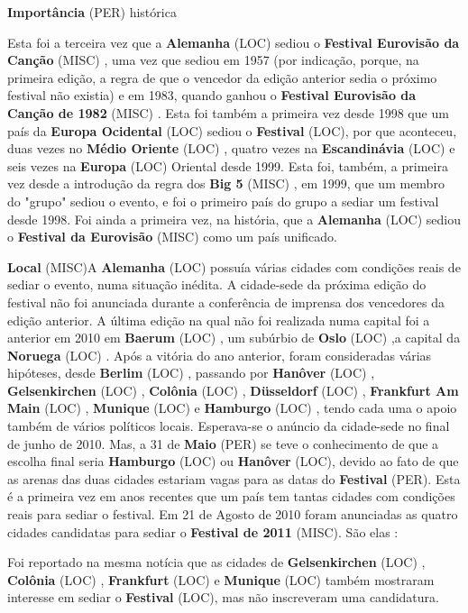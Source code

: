 \documentclass[12pt,a4paper]{article}
\begin{document}
\textbf{Importância} (PER) histórica

Esta foi a terceira vez que a \textbf{Alemanha} (LOC) sediou o \textbf{Festival Eurovisão da Canção} (MISC) , uma vez que sediou em 1957 (por indicação, porque, na primeira edição, a regra de que o vencedor da edição anterior sedia o próximo festival não existia) e em 1983, quando ganhou o \textbf{Festival Eurovisão da Canção de 1982} (MISC) . Esta foi também a primeira vez desde 1998 que um país da \textbf{Europa Ocidental} (LOC) sediou o \textbf{Festival} (LOC), por que aconteceu, duas vezes no \textbf{Médio Oriente} (LOC) , quatro vezes na \textbf{Escandinávia} (LOC) e seis vezes na \textbf{Europa} (LOC) Oriental desde 1999. Esta foi, também, a primeira vez desde a introdução da regra dos \textbf{Big 5} (MISC) , em 1999, que um membro do "grupo" sediou o evento, e foi o primeiro país do grupo a sediar um festival desde 1998. Foi ainda a primeira vez, na história, que a \textbf{Alemanha} (LOC) sediou o \textbf{Festival da Eurovisão} (MISC) como um país unificado.



\textbf{Local} (MISC)A \textbf{Alemanha} (LOC) possuía várias cidades com condições reais de sediar o evento, numa situação inédita. A cidade-sede da próxima edição do festival não foi anunciada durante a conferência de imprensa dos vencedores da edição anterior. A última edição na qual não foi realizada numa capital foi a anterior em 2010 em \textbf{Baerum} (LOC) , um subúrbio de \textbf{Oslo} (LOC) ,a capital da \textbf{Noruega} (LOC) . Após a vitória do ano anterior, foram consideradas várias hipóteses, desde \textbf{Berlim} (LOC) , passando por \textbf{Hanôver} (LOC) , \textbf{Gelsenkirchen} (LOC) , \textbf{Colônia} (LOC) , \textbf{Düsseldorf} (LOC) , \textbf{Frankfurt Am Main} (LOC) , \textbf{Munique} (LOC) e \textbf{Hamburgo} (LOC) , tendo cada uma o apoio também de vários políticos locais. Esperava-se o anúncio da cidade-sede no final de junho de 2010. Mas, a 31 de \textbf{Maio} (PER) se teve o conhecimento de que a escolha final seria \textbf{Hamburgo} (LOC) ou \textbf{Hanôver} (LOC), devido ao fato de que as arenas das duas cidades estariam vagas para as datas do \textbf{Festival} (PER). Esta é a primeira vez em anos recentes que um país tem tantas cidades com condições reais para sediar o festival. Em 21 de Agosto de 2010 foram anunciadas as quatro cidades candidatas para sediar o \textbf{Festival de 2011} (MISC). São elas :

Foi reportado na mesma notícia que as cidades de \textbf{Gelsenkirchen} (LOC) , \textbf{Colônia} (LOC) , \textbf{Frankfurt} (LOC) e \textbf{Munique} (LOC) também mostraram interesse em sediar o \textbf{Festival} (LOC), mas não inscreveram uma candidatura.
\end{document}
